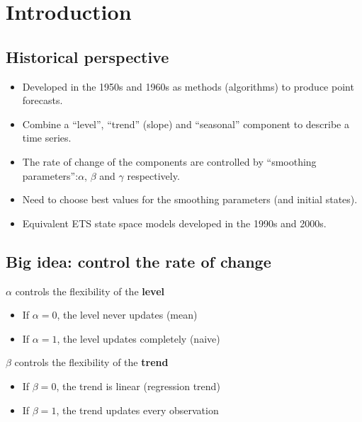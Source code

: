 \documentclass[]{book}
\providecommand{\tightlist}{%
  \setlength{\itemsep}{0pt}\setlength{\parskip}{0pt}}
\begin{document}

\hypertarget{introduction}{%
\section{Introduction}\label{introduction}}

\hypertarget{historical-perspective}{%
\subsection{Historical perspective}\label{historical-perspective}}

\begin{itemize}
\tightlist
\item
  Developed in the 1950s and 1960s as methods (algorithms) to produce point forecasts.
\item
  Combine a ``level'', ``trend'' (slope) and ``seasonal'' component to describe a time series.
\item
  The rate of change of the components are controlled by ``smoothing parameters'':\newline \(\alpha\), \(\beta\) and \(\gamma\) respectively.
\item
  Need to choose best values for the smoothing parameters (and initial states).
\item
  Equivalent ETS state space models developed in the 1990s and 2000s.
\end{itemize}

\hypertarget{big-idea-control-the-rate-of-change}{%
\subsection{Big idea: control the rate of change}\label{big-idea-control-the-rate-of-change}}

\(\alpha\) controls the flexibility of the \textbf{level}

\begin{itemize}
\tightlist
\item
  If \(\alpha = 0\), the level never updates (mean)
\item
  If \(\alpha = 1\), the level updates completely (naive)
\end{itemize}

\(\beta\) controls the flexibility of the \textbf{trend}

\begin{itemize}
\tightlist
\item
  If \(\beta = 0\), the trend is linear (regression trend)
\item
  If \(\beta = 1\), the trend updates every observation
\end{itemize}
\end{document}
